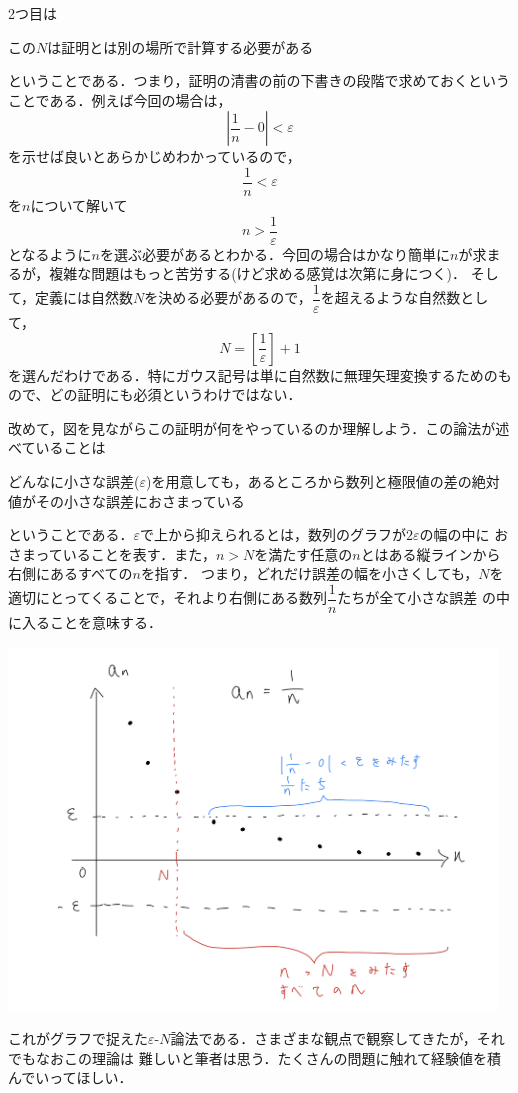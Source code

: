 \documentclass[a4paper,12pt,autodetect-engine,dvipdfmx]{jsarticle}
\theoremstyle{definition}
\begin{document}
2つ目は
\begin{center}
    この$N$は証明とは別の場所で計算する必要がある
\end{center}
ということである．つまり，証明の清書の前の下書きの段階で求めておくということである．例えば今回の場合は，
$$\left|\dfrac{1}{n}- 0\right| < \varepsilon$$
を示せば良いとあらかじめわかっているので，
\begin{equation*}
    \dfrac{1}{n} < \varepsilon
\end{equation*}
を$n$について解いて
$$n > \dfrac{1}{\varepsilon}$$
となるように$n$を選ぶ必要があるとわかる．今回の場合はかなり簡単に$n$が求まるが，複雑な問題はもっと苦労する(けど求める感覚は次第に身につく)．
そして，定義には自然数$N$を決める必要があるので，$\dfrac{1}{\varepsilon}$を超えるような自然数として，
$$N = \left[\dfrac{1}{\varepsilon}\right]+1$$
を選んだわけである．特にガウス記号は単に自然数に無理矢理変換するためのもので、どの証明にも必須というわけではない．

改めて，図を見ながらこの証明が何をやっているのか理解しよう．この論法が述べていることは
\begin{center}
    どんなに小さな誤差($\varepsilon$)を用意しても，あるところから数列と極限値の差の絶対値がその小さな誤差におさまっている
\end{center}
ということである．$\varepsilon$で上から抑えられるとは，数列のグラフが$2\varepsilon$の幅の中に
おさまっていることを表す．また，$n>N$を満たす任意の$n$とはある縦ラインから右側にあるすべての$n$を指す．
つまり，どれだけ誤差の幅を小さくしても，$N$を適切にとってくることで，それより右側にある数列$\dfrac{1}{n}$たちが全て小さな誤差
の中に入ることを意味する．

\begin{center}
    \includegraphics[width=13cm]{image.jpeg}
\end{center}
これがグラフで捉えた$\varepsilon$-$N$論法である．さまざまな観点で観察してきたが，それでもなおこの理論は
難しいと筆者は思う．たくさんの問題に触れて経験値を積んでいってほしい．
\end{document}
